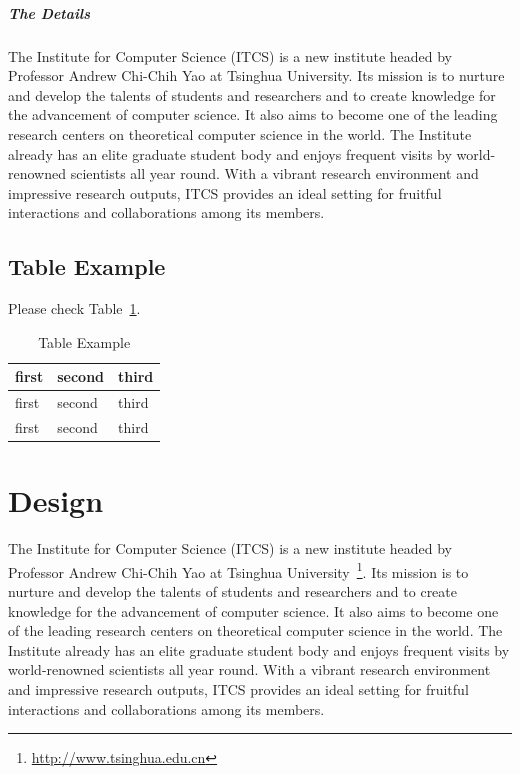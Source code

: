\documentclass{ics}
\begin{document}
\subparagraph{The Details}
\label{sec:details-1}
The Institute for Computer Science (ITCS) is a new institute headed by Professor
Andrew Chi-Chih Yao at Tsinghua University. Its mission is to nurture and
develop the talents of students and researchers and to create knowledge for the
advancement of computer science. It also aims to become one of the leading
research centers on theoretical computer science in the world. The Institute
already has an elite graduate student body and enjoys frequent visits by
world-renowned scientists all year round. With a vibrant research environment
and impressive research outputs, ITCS provides an ideal setting for fruitful
interactions and collaborations among its members.

\subsection{Table Example}
\label{sec:more-more-details-1}
Please check Table~\ref{tab:example}.

\begin{table}[h]
  \centering
  \caption{Table Example}
  \label{tab:example}
  \begin{tabular}{|l|l|l|}
    \hline
    first & second & third \\
    \hline
    first & second & third \\
    \hline
    first & second & third \\
    \hline
  \end{tabular}
\end{table}

\section{Design}
\label{sec:design}
The Institute for Computer Science (ITCS) is a new institute headed by Professor
Andrew Chi-Chih Yao at Tsinghua
University~\footnote{\url{http://www.tsinghua.edu.cn}}. Its mission is to
nurture and develop the talents of students and researchers and to create
knowledge for the advancement of computer science. It also aims to become one of
the leading research centers on theoretical computer science in the world. The
Institute already has an elite graduate student body and enjoys frequent visits
by world-renowned scientists all year round. With a vibrant research environment
and impressive research outputs, ITCS provides an ideal setting for fruitful
interactions and collaborations among its members.
\end{document}
